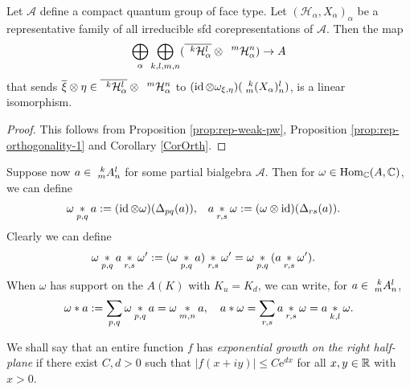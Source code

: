 \begin{Cor} \label{cor:rep-pw}
  Let $\mathscr{A}$ define a compact quantum group of face type. Let
  $(\mathcal{H}_{\alpha},X_{\alpha})_{\alpha}$ be a representative
  family of all irreducible sfd corepresentations of
  $\mathscr{A}$. Then the map
  \begin{align*}
    \bigoplus_{\alpha} \bigoplus_{k,l,m,n}
    (\overline{\Gru{\mathcal{H}_{\alpha}}{k}{l}} \otimes
    \Gru{\mathcal{H}_{\alpha}}{m}{n}) \to A
  \end{align*}
  that sends $\overline{\xi} \otimes \eta \in
  \overline{\Gru{\mathcal{H}_{\alpha}}{k}{l}} \otimes
  \Gru{\mathcal{H}_{\alpha}}{m}{n}$ to $ (\id \otimes
  \omega_{\xi,\eta})(\Gr{(X_{\alpha})}{k}{l}{m}{n})$,
  is a linear isomorphism.
\end{Cor}
\begin{proof} This follows from Proposition \ref{prop:rep-weak-pw}, Proposition \ref{prop:rep-orthogonality-1} and Corollary \ref{CorOrth}.
\end{proof}

Suppose now $a\in \Gr{A}{k}{l}{m}{n}$ for some partial bialgebra $\mathscr{A}$. Then for $\omega \in \Hom_{\C}(A,\C)$, we can define
\begin{align*}
  \omega \aste{p,q} a
&:= (\id \otimes \omega) (\Delta_{pq}(a)), & a \aste{r,s}
\omega&:=(\omega \otimes \id)(\Delta_{rs}(a)).\end{align*} Clearly we can define
\begin{align*} \omega \aste{p,q} a \aste{r,s}
\omega'&:= (\omega \aste{p,q} a)\aste{r,s} \omega' = \omega \aste{p,q}(a \aste{r,s} \omega').\end{align*}
When $\omega$ has support on the $A(K)$ with $K_u=K_d$, we can write, for $a\in \Gr{A}{k}{l}{m}{n}$, \[\omega\ast a := \sum_{p,q} \omega\aste{p,q}a = \omega\aste{m,n}a,\quad  a\ast \omega = \sum_{r,s} a\aste{r,s}\omega = a\aste{k,l}\omega.\] 

We shall say that an entire function $f$ has \emph{exponential growth
  on the right half-plane} if there exist $C,d>0$ such that $|f(x+iy)|\leq
C\mathrm{e}^{dx}$  for all $x,y\in \R$ with $x>0$. 


